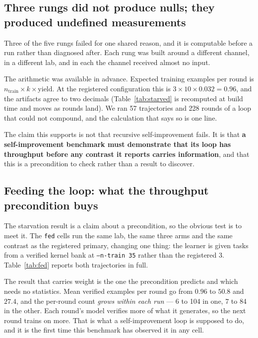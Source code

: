 \subsection{Three rungs did not produce nulls; they produced undefined measurements}
\label{sec:motivation:starved}

Three of the five rungs failed for one shared reason, and it is computable before a run rather
than diagnosed after. Each rung was built around a different channel, in a different lab, and in
each the channel received almost no input.



The arithmetic was available in advance. Expected training examples per round is
$n_{\mathrm{train}} \times k \times \text{yield}$. At the registered configuration this is
$3 \times 10 \times 0.032 = 0.96$, and the artifacts agree to two decimals (Table~\ref{tab:starved}
is recomputed at build time and moves as rounds land). We ran 57 trajectories and 228 rounds
of a loop that could not compound, and the calculation that says so is one line.

The claim this supports is not that recursive self-improvement fails. It is that \textbf{a
self-improvement benchmark must demonstrate that its loop has throughput before any contrast it
reports carries information}, and that this is a precondition to check rather than a result to
discover.

\subsection{Feeding the loop: what the throughput precondition buys}
\label{sec:motivation:fed}

The starvation result is a claim about a precondition, so the obvious test is to meet it. The
\texttt{fed} cells run the same lab, the same three arms and the same contrast as the registered
primary, changing one thing: the learner is given tasks from a verified kernel bank at
\texttt{--n-train 35} rather than the registered 3. Table~\ref{tab:fed} reports both trajectories
in full.

The result that carries weight is the one the precondition predicts and which needs no statistics.
Mean verified examples per round go from $0.96$ to $50.8$ and $27.4$, and the per-round count
\emph{grows within each run} --- 6 to 104 in one, 7 to 84 in the other. Each round's model verifies
more of what it generates, so the next round trains on more. That is what a self-improvement loop
is supposed to do, and it is the first time this benchmark has observed it in any cell.

